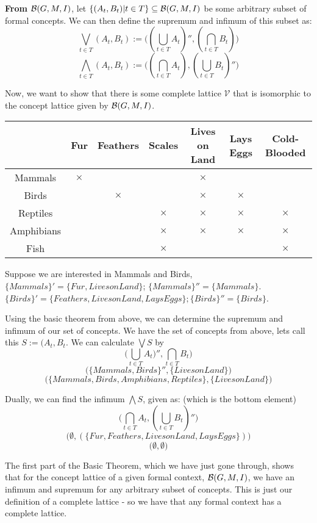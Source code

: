 \textbf{From $\mathcal{B}(G,M,I)$}, let $\{(A_t, B_t) | t\in T\} \subseteq \mathcal{B} (G,M,I)$ be some arbitrary subset of formal concepts. We can then define the supremum and infimum of this subset as: 
\[ \bigvee_{t\in T} (A_t, B_t) := \Big( (\bigcup_{t\in T} A_t)'', (\bigcap_{t\in T}B_t) \Big)\] 
\[ \bigwedge_{t\in T} (A_t, B_t) := \Big( (\bigcap_{t\in T} A_t), (\bigcup_{t\in T}B_t)'' \Big)\] 

Now, we want to show that there is some complete lattice $\mathcal{V}$ that is isomorphic to the concept lattice given by $\mathcal{B}(G,M,I)$.
\begin{center}
    \begin{tabular}{c|cccccc}
        & Fur & Feathers & Scales & Lives on Land & Lays Eggs & Cold-Blooded \\ \hline
        Mammals     & $\times$   &       &         &  $\times$ & &          \\
        Birds       &     & $\times$     &         & $\times$   & $\times$ &          \\
        Reptiles    &     &       & $\times$       & $\times$   & $\times$ & $\times$        \\
        Amphibians  &     &       & $\times$       & $\times$   & $\times$ & $\times$        \\
        Fish        &     &       & $\times$       &     &   & $\times$        \\
    \end{tabular}
\end{center}

Suppose we are interested in Mammals and Birds, $\{Mammals\}' = \{Fur, Lives on Land\}$; $\{Mammals\}'' = \{Mammals\}$. $\{Birds\}' = \{Feathers, Lives on Land, Lays Eggs\}; \{Birds\}'' = \{Birds\}$.

Using the basic theorem from above, we can determine the supremum and infimum of our set of concepts. We have the set of concepts from above, lets call this $ S := (A_t, B_t$. We can calculate $\bigvee S$ by 
\[\Big(\bigcup_{t\in T} A_t)'', \bigcap_{t\in T} B_t\Big)\] 
\[\Big(\{Mammals, Birds\}'', \{Lives on Land\} \Big)\] 
\[\Big( \{Mammals, Birds, Amphibians, Reptiles\}, \{Lives on Land\}\Big)\] 

Dually, we can find the infimum $\bigwedge S$, given as: (which is the bottom element) 
\[\Big(\bigcap_{t\in T}A_t, (\bigcup_{t\in T}B_t)'' \Big) \]
\[\Big(\emptyset, (\{Fur, Feathers, Lives on Land, Lays Eggs\})\Big) \]
\[\Big(\emptyset, \emptyset \Big) \]

The first part of the Basic Theorem, which we have just gone through, shows that for the concept lattice of a given formal context, $\mathcal{B} (G,M,I)$, we have an infimum and supremum for any arbitrary subset of concepts. This is just our definition of a complete lattice - so we have that any formal context has a complete lattice. 

